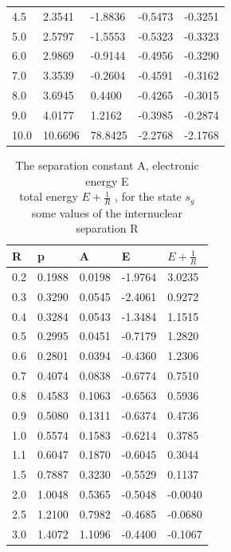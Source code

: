 \begin{table}[ht]
{\begin{tabular}{ m{6em} m{6em}  m{6em}  m{6em} m{6em} }
        4.5 & 2.3541 & -1.8836 & -0.5473 & -0.3251 \\
        5.0 & 2.5797 & -1.5553 & -0.5323 & -0.3323 \\
        6.0 & 2.9869 & -0.9144 & -0.4956 & -0.3290 \\
        7.0 & 3.3539 & -0.2604 & -0.4591 & -0.3162 \\
        8.0 & 3.6945 & 0.4400 & -0.4265 & -0.3015 \\
        9.0 & 4.0177 & 1.2162 & -0.3985 & -0.2874 \\
        10.0 & 10.6696 & 78.8425 & -2.2768 & -2.1768 \\
      \hline
      \end{tabular}
}
\end{table}

\begin{table}[hb]
{
   \caption{ The separation constant A, electronic energy E \\ total energy $ E + \frac{1}{R} $ , for the state $ s_g $ some values of the internuclear separation R \\[1.1em] }
		\begin{tabular}{ m{6em} m{6em}  m{6em}  m{6em} m{6em} }
		\hline
		    R & p & A & E & $ E + \frac{1}{R} $ \\ \hline \hline
        0.2 & 0.1988 & 0.0198 & -1.9764 & 3.0235 \\
        0.3 & 0.3290 & 0.0545 & -2.4061 & 0.9272 \\
        0.4 & 0.3284 & 0.0543 & -1.3484 & 1.1515 \\
        0.5 & 0.2995 & 0.0451 & -0.7179 & 1.2820 \\
        0.6 & 0.2801 & 0.0394 & -0.4360 & 1.2306 \\
        0.7 & 0.4074 & 0.0838 & -0.6774 & 0.7510 \\
        0.8 & 0.4583 & 0.1063 & -0.6563 & 0.5936 \\
        0.9 & 0.5080 & 0.1311 & -0.6374 & 0.4736 \\
        1.0 & 0.5574 & 0.1583 & -0.6214 & 0.3785 \\
        1.1 & 0.6047 & 0.1870 & -0.6045 & 0.3044 \\
        1.5 & 0.7887 & 0.3230 & -0.5529 & 0.1137 \\
        2.0 & 1.0048 & 0.5365 & -0.5048 & -0.0040 \\
        2.5 & 1.2100 & 0.7982 & -0.4685 & -0.0680 \\
        3.0 & 1.4072 & 1.1096 & -0.4400 & -0.1067 \\

\end{tabular}}
\end{table}
